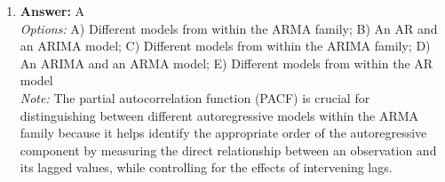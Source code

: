 \documentclass[12pt]{article}
\begin{document}
\begin{enumerate}[label=\arabic*.]
\\ \textit{Note:} Running a deficit during a recession allows the federal government to increase public spending and stimulate economic activity, which can help reduce unemployment and promote recovery.
\item \textbf{Answer:} A
\\ \textit{Options:} A) Different models from within the ARMA family; B) An AR and an ARIMA model; C) Different models from within the ARIMA family; D) An ARIMA and an ARMA model; E) Different models from within the AR model
\\ \textit{Note:} The partial autocorrelation function (PACF) is crucial for distinguishing between different autoregressive models within the ARMA family because it helps identify the appropriate order of the autoregressive component by measuring the direct relationship between an observation and its lagged values, while controlling for the effects of intervening lags.
\end{enumerate}
\end{document}
